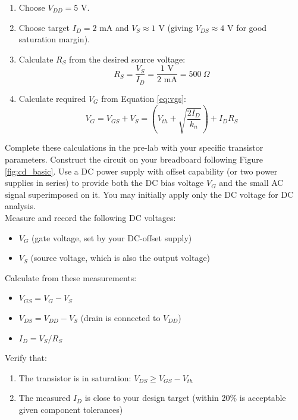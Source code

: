 \documentclass[10pt]{article}
\begin{document}
\begin{enumerate}
    \item Choose $V_{DD} = 5$ V. 
    
    \item Choose target $I_D = 2$ mA and $V_S \approx 1$ V (giving $V_{DS} \approx 4$ V for good saturation margin). 
    
    \item Calculate $R_S$ from the desired source voltage:
    \begin{equation}
        R_S = \frac{V_S}{I_D} = \frac{1\text{ V}}{2\text{ mA}} = 500\ \Omega
    \end{equation}
    
    \item Calculate required $V_G$ from Equation \ref{eq:vgs}:
    \begin{equation}
        V_G = V_{GS} + V_S = \left(V_{th} + \sqrt{\frac{2 I_D}{k_n}}\right) + I_D R_S
    \end{equation}
    
\end{enumerate}

Complete these calculations in the pre-lab with your specific transistor parameters.  Construct the circuit on your breadboard following Figure \ref{fig:cd_basic}. Use a DC power supply with offset capability (or two power supplies in series) to provide both the DC bias voltage $V_G$ and the small AC signal superimposed on it. You may initially apply only the DC voltage for DC analysis.  \\

Measure and record the following DC voltages: 

\begin{itemize}
    \item $V_G$ (gate voltage, set by your DC-offset supply)
    \item $V_S$ (source voltage, which is also the output voltage)
\end{itemize}

Calculate from these measurements: 

\begin{itemize}
    \item $V_{GS} = V_G - V_S$
    \item $V_{DS} = V_{DD} - V_S$ (drain is connected to $V_{DD}$)
    \item $I_D = V_S/R_S$
\end{itemize}

Verify that: 
\begin{enumerate}
    \item The transistor is in saturation:  $V_{DS} \geq V_{GS} - V_{th}$
    \item The measured $I_D$ is close to your design target (within 20\% is acceptable given component tolerances)
\end{enumerate}
\end{document}
